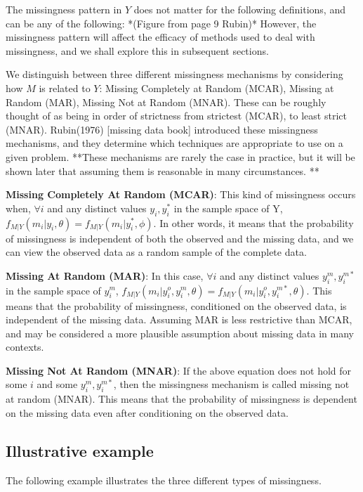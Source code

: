 \documentclass{article}
\begin{document}
	The missingness pattern in $Y$ does not matter for the following definitions, and can be any of the following: *(Figure from page 9 Rubin)* 
	However, the missingness pattern will affect the efficacy of methods used to deal with missingness, and we shall explore this in subsequent sections.
	
	We distinguish between three different missingness mechanisms by considering how $M$ is related to $Y$: Missing Completely at Random (MCAR), Missing at Random (MAR), Missing Not at Random (MNAR). These can be roughly thought of as being in order of strictness from strictest (MCAR), to least strict (MNAR). Rubin(1976) [missing data book] introduced these missingness mechanisms, and they determine which techniques are appropriate to use on a given problem. **These mechanisms are rarely the case in practice, but it will be shown later that assuming them is reasonable in many circumstances. **
	
	\textbf{Missing Completely At Random (MCAR)}:
	This kind of missingness occurs when, $\forall i$ and any distinct values $y_{i}, y^{\ast}_{i}$ in the sample space of Y, $f_{M|Y}(m_{i}|y_{i}, \theta) = f_{M|Y}(m_{i}|y^{\ast}_{i}, \phi)$. In other words, it means that the probability of missingness is independent of both the observed and the missing data, and we can view the observed data as a random sample of the complete data.
	
	\textbf{Missing At Random (MAR)}:
	In this case, $\forall i$ and any distinct values $y^{m}_{i}, y^{m\ast}_{i}$ in the sample space of $y^{m}_{i}$, $f_{M|Y}(m_{i}|y^{o}_{i}, y^{m}_{i}, \theta) = f_{M|Y}(m_{i}|y^{o}_{i}, y^{m\ast}_{i}, \theta)$.
	This means that the probability of missingness, conditioned on the observed data, is independent of the missing data. Assuming MAR is less restrictive than MCAR, and may be considered a more plausible assumption about missing data in many contexts. 
	
	\textbf{Missing Not At Random (MNAR)}:
	If the above equation does not hold for some $i$ and some $y^{m}_{i}, y^{m\ast}_{i}$, then the missingness mechanism is called missing not at random (MNAR). This means that the probability of missingness is dependent on the missing data even after conditioning on the observed data.
	
	
	\subsection{Illustrative example}
	
	The following example illustrates the three different types of missingness.
	
\end{document}
